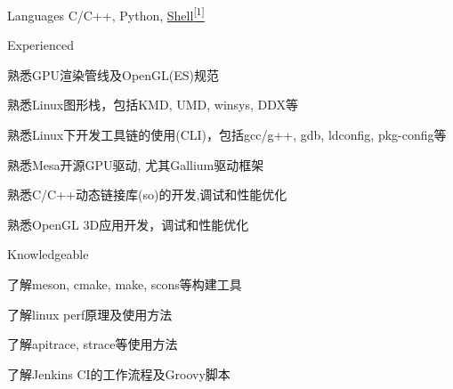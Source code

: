 
\begin{cvskills}
  \cvskill
    {Languages} %
    {C/C++, Python, \hyperlink{shell-proj}{Shell\textsuperscript{[1]}}} %
\end{cvskills}

\begin{cventries}
  \cventry
    {} %
    {Experienced} %
    {} %
    {} %
    {
      \begin{cvitems} %
        \item {熟悉GPU渲染管线及OpenGL(ES)规范}
        \item {熟悉Linux图形栈，包括KMD, UMD, winsys, DDX等}
        \item {熟悉Linux下开发工具链的使用(CLI)，包括gcc/g++, gdb, ldconfig, pkg-config等}
        \item {熟悉Mesa开源GPU驱动, 尤其Gallium驱动框架}
        \item {熟悉C/C++动态链接库(so)的开发,调试和性能优化}
        \item {熟悉OpenGL 3D应用开发，调试和性能优化}
      \end{cvitems}
    }
  \cventry
    {} %
    {Knowledgeable} %
    {} %
    {} %
    {
      \begin{cvitems} %
        \item {了解meson, cmake, make, scons等构建工具}
        \item {了解linux perf原理及使用方法}
        \item {了解apitrace, strace等使用方法}
        \item {了解Jenkins CI的工作流程及Groovy脚本}
      \end{cvitems}
    }
\end{cventries}
